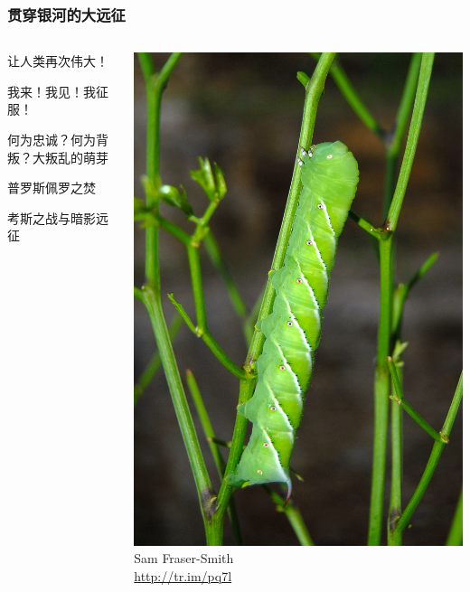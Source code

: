 \documentclass{beamer}
\newcommand{\linespace}{\vskip 0.25cm}
\begin{document}
\begin{frame}
  \frametitle{\textbf{贯穿银河的大远征}}
  
  \begin{columns}
  \begin{column}{.65\textwidth}
	让人类再次伟大！

\linespace

我来！我见！我征服！

\linespace
  
何为忠诚？何为背叛？大叛乱的萌芽

\linespace
  
普罗斯佩罗之焚
\linespace
  
考斯之战与暗影远征
  \end{column}
  \begin{column}{.35\textwidth}
    \includegraphics[width=.95\textwidth]{Fig/FigB.jpg}
    \\
    \tiny{Sam Fraser-Smith \\ \textcolor{blue}{\url{http://tr.im/pq7l}} }
  \end{column}
  \end{columns}

\end{frame}
\end{document}

